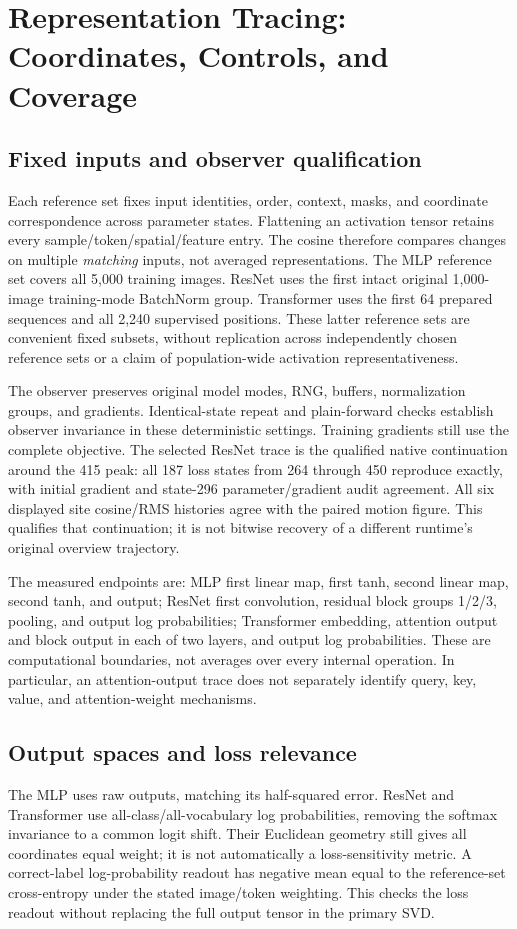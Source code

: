 \clearpage
\section{Representation Tracing: Coordinates, Controls, and Coverage}

\subsection{Fixed inputs and observer qualification}
Each reference set fixes input identities, order, context, masks, and coordinate correspondence across parameter states. Flattening an activation tensor retains every sample/token/spatial/feature entry. The cosine therefore compares changes on multiple \emph{matching} inputs, not averaged representations. The MLP reference set covers all 5,000 training images. ResNet uses the first intact original 1,000-image training-mode BatchNorm group. Transformer uses the first 64 prepared sequences and all 2,240 supervised positions. These latter reference sets are convenient fixed subsets, without replication across independently chosen reference sets or a claim of population-wide activation representativeness.

The observer preserves original model modes, RNG, buffers, normalization groups, and gradients. Identical-state repeat and plain-forward checks establish observer invariance in these deterministic settings. Training gradients still use the complete objective. The selected ResNet trace is the qualified native continuation around the 415 peak: all 187 loss states from 264 through 450 reproduce exactly, with initial gradient and state-296 parameter/gradient audit agreement. All six displayed site cosine/RMS histories agree with the paired motion figure. This qualifies that continuation; it is not bitwise recovery of a different runtime's original overview trajectory.

The measured endpoints are: MLP first linear map, first tanh, second linear map, second tanh, and output; ResNet first convolution, residual block groups 1/2/3, pooling, and output log probabilities; Transformer embedding, attention output and block output in each of two layers, and output log probabilities. These are computational boundaries, not averages over every internal operation. In particular, an attention-output trace does not separately identify query, key, value, and attention-weight mechanisms.

\subsection{Output spaces and loss relevance}
The MLP uses raw outputs, matching its half-squared error. ResNet and Transformer use all-class/all-vocabulary log probabilities, removing the softmax invariance to a common logit shift. Their Euclidean geometry still gives all coordinates equal weight; it is not automatically a loss-sensitivity metric. A correct-label log-probability readout has negative mean equal to the reference-set cross-entropy under the stated image/token weighting. This checks the loss readout without replacing the full output tensor in the primary SVD.

